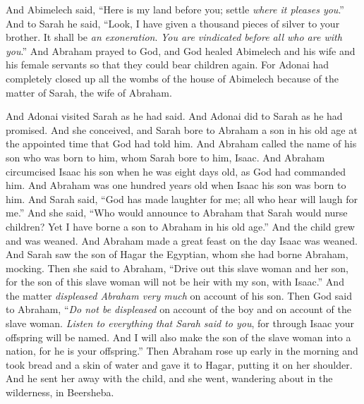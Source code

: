 \begin{biblechapter}
\verse And Abimelech said, “Here is my land before you; settle \textit{where it pleases you}.”
\verse And to Sarah he said, “Look, I have given a thousand pieces of silver to your brother. It shall be \textit{an exoneration}. \textit{You are vindicated before all who are with you}.”
\verse And Abraham prayed to God, and God healed Abimelech and his wife and his female servants so that they could bear children again.
\verse For Adonai had completely closed up all the wombs of the house of Abimelech because of the matter of Sarah, the wife of Abraham.
\end{biblechapter}

\begin{biblechapter} %
 And Adonai visited Sarah as he had said. And Adonai did to Sarah as he had promised.
\verse And she conceived, and Sarah bore to Abraham a son in his old age at the appointed time that God had told him.
\verse And Abraham called the name of his son who was born to him, whom Sarah bore to him, Isaac.
\verse And Abraham circumcised Isaac his son when he was eight days old, as God had commanded him.
\verse And Abraham was one hundred years old when Isaac his son was born to him.
\verse And Sarah said, “God has made laughter for me; all who hear will laugh for me.”
\verse And she said, “Who would announce to Abraham that Sarah would nurse children? Yet I have borne a son to Abraham in his old age.”
 And the child grew and was weaned. And Abraham made a great feast on the day Isaac was weaned.
\verse And Sarah saw the son of Hagar the Egyptian, whom she had borne Abraham, mocking.
\verse Then she said to Abraham, “Drive out this slave woman and her son, for the son of this slave woman will not be heir with my son, with Isaac.”
\verse And the matter \textit{displeased Abraham very much} on account of his son.
\verse Then God said to Abraham, “\textit{Do not be displeased} on account of the boy and on account of the slave woman. \textit{Listen to everything that Sarah said to you}, for through Isaac your offspring will be named.
\verse And I will also make the son of the slave woman into a nation, for he is your offspring.”
\verse Then Abraham rose up early in the morning and took bread and a skin of water and gave it to Hagar, putting it on her shoulder. And he sent her away with the child, and she went, wandering about in the wilderness, in Beersheba.

\end{biblechapter}
